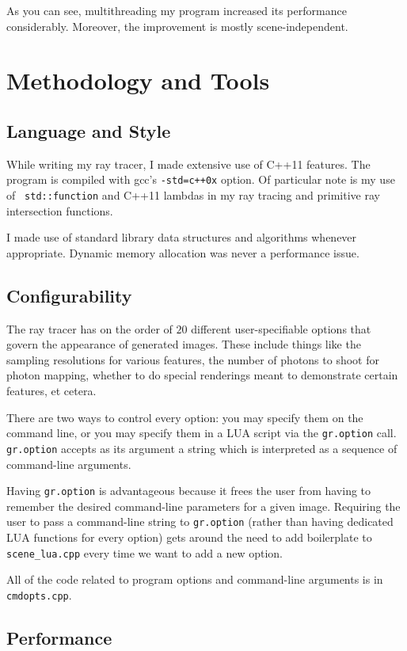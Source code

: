 \documentclass{article}
\begin{document}
As you can see, multithreading my program increased its performance
considerably. Moreover, the improvement is mostly scene-independent.

\section{Methodology and Tools}

\subsection{Language and Style}

While writing my ray tracer, I made extensive use of C++11 features. The program
is compiled with gcc's {\tt -std=c++0x} option. Of particular note is my use of {\tt
std::function} and C++11 lambdas in my ray tracing and primitive ray intersection
functions.

I made use of standard library data structures and algorithms whenever
appropriate. Dynamic memory allocation was never a performance issue.

\subsection{Configurability}

The ray tracer has on the order of $20$ different user-specifiable options that
govern the appearance of generated images. These include things like the sampling
resolutions for various features, the number of photons to shoot for photon mapping,
whether to do special renderings meant to demonstrate certain features, et
cetera.

There are two ways to control every option: you may specify them on the
command line, or you may specify them in a LUA script via the {\tt gr.option}
call. {\tt gr.option} accepts as its argument a string which is interpreted as a
sequence of command-line arguments.

Having {\tt gr.option} is advantageous because it frees the user from having to
remember the desired command-line parameters for a given image. Requiring the
user to pass a command-line string to {\tt gr.option} (rather than having
dedicated LUA functions for every option) gets around the need to
add boilerplate to {\tt scene\_lua.cpp} every time we want to add a new
option.

All of the code related to program options and command-line arguments is in
{\tt cmdopts.cpp}.

\subsection{Performance}
\end{document}
